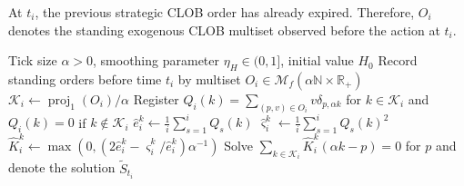 \documentclass[11pt]{article}
\begin{document}
At $t_i$, the previous strategic CLOB order has already expired. Therefore, $O_i$ denotes the standing exogenous CLOB multiset observed before the action at $t_i$.

\begin{algorithm}[ht!]
\caption{{Computation of the raw estimator $H_{t_i}^\circ$ for $i \in \llbracket 0, n \rrbracket$}}
\label{alg:hyp_clearing_price}
\begin{algorithmic}[1]
\REQUIRE Tick size $\alpha>0$, smoothing parameter $\eta_H\in(0,1]$, initial value $H_0$
\STATE Record standing orders before time $t_i$ by multiset $O_i \in \mathcal{M}_f (\alpha \mathbb{N}\times \mathbb{R}_+)$
\STATE $\mathcal{K}_i \gets \operatorname{proj}_1(O_i)/\alpha$ 
\STATE Register $Q_i(k)= \sum_{(p,v)\in O_i} v\delta_{p,\alpha k}$ for $k \in \mathcal{K}_i$ and $Q_i(k)=0$ if $k\notin \mathcal{K}_i$
      \STATE $\hat e_i^k \gets \frac{1}{i} \sum_{s = 1}^i Q_s(k)$ 
      \STATE $\hat \varsigma_i^k \gets \frac{1}{i} \sum_{s = 1}^i Q_s(k)^2$ 
      \STATE $\hat K_i^k \gets  \max(0,(2\hat e_i^k-\hat \varsigma_i^k/\hat e_i^k)\alpha^{-1})$ 
\ENDFOR
{}
\STATE Solve $\sum_{k \in \mathcal{K}_i}\hat{K}_i^k(\alpha k-p) = 0$ for $p$ and denote the solution $\tilde S_{t_i}$ 
 
\ELSE
{}
\ENDIF
\ELSE
{}
\ENDIF
\ENDFOR
\end{algorithmic}
\end{algorithm}
\end{document}
